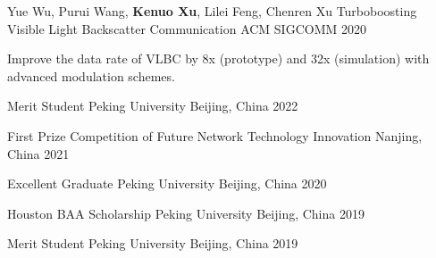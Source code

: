 \documentclass[11pt, a4paper]{awesome-cv}
\begin{document}
\begin{cventries}
	\cventry
	{Yue Wu, Purui Wang, \textbf{Kenuo Xu}, Lilei Feng, Chenren Xu}
	{Turboboosting Visible Light Backscatter Communication}
	{ACM SIGCOMM}
	{2020}
	{
		\begin{cvitems} %
			\item {Improve the data rate of VLBC by 8x (prototype) and 32x (simulation) with advanced modulation schemes.}
		\end{cvitems}
	}
	
	
\end{cventries}


\begin{cvhonors}
	
	\cvhonor
	{Merit Student} %
	{Peking University} %
	{Beijing, China} %
	{2022} %
	
	\cvhonor
	{First Prize} %
	{Competition of Future Network Technology Innovation} %
	{Nanjing, China} %
	{2021} %
	
	\cvhonor
	{Excellent Graduate} %
	{Peking University} %
	{Beijing, China} %
	{2020} %
	
	\cvhonor
	{Houston BAA Scholarship} %
	{Peking University} %
	{Beijing, China} %
	{2019} %
	
	\cvhonor
	{Merit Student} %
	{Peking University} %
	{Beijing, China} %
	{2019} %

\end{cvhonors}
\end{document}
